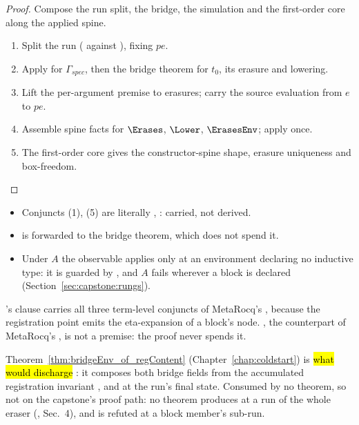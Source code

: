 \begin{proof} \leanok
{}
 Compose the run split, the bridge, the simulation and the first-order core along the
applied spine.
\begin{enumerate}
\item Split the run ( against ), fixing $pe$.
\item Apply  for $\Gamma_{spec}$, then the bridge theorem for $t_0$, its erasure and
lowering.
\item Lift the per-argument premise to erasures; carry the source evaluation from $e$ to $pe$.
\item Assemble spine facts for $\Erases$, $\Lower$, $\ErasesEnv$; apply  once.
\item The first-order core gives the constructor-spine shape, erasure uniqueness and box-freedom.
\end{enumerate}
\end{proof}

\begin{remark}
\begin{itemize}
\item Conjuncts (1), (5) are literally , : carried, not derived.
\item {} is forwarded to the bridge theorem, which does not spend it.
\item Under $A$ the observable applies only at an environment declaring no inductive type: it is
guarded by , and $A$ fails wherever a block is declared
(Section~\ref{sec:capstone:rungs}).
\end{itemize}
 's  clause carries all three term-level conjuncts
of MetaRocq's , because the registration point emits the eta-expansion of a
block's node. , the counterpart of MetaRocq's , is not a
premise: the proof never spends it.
\end{remark}

\begin{remark}
 Theorem~\ref{thm:bridgeEnv_of_regContent} (Chapter~\ref{chap:coldstart}) is
\hl{what would discharge }: it composes both bridge fields from the accumulated
registration invariant ,  and  at the run's
final state. Consumed by no theorem, so not on the capstone's proof path: no theorem produces
 at a run of the whole eraser (\stOpen{},  Sec.~4),
and  is refuted at a block member's sub-run.
\end{remark}

